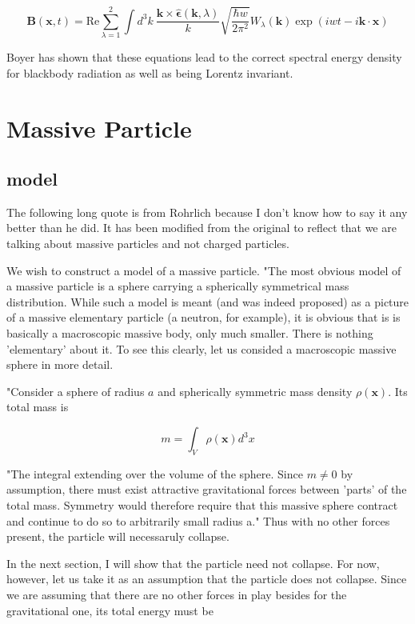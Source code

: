 \documentclass {article}
\renewcommand\vec{\mathbf}
\let\OldHat\hat
\renewcommand{\hat}[1]{\OldHat{\mathbf{#1}}}
\begin{document}
$$\vec B (\vec x ,  t) = \text {Re} \sum_{\lambda = 1}^2  \int d^3k ~ \frac {\vec k \times \hat \epsilon(\vec k, \lambda)} k \sqrt {\frac {\hbar w} {2 \pi^2}} W_{\lambda}(\vec k) \exp(iwt - i\vec k \cdot \vec x)$$


Boyer has shown that these equations lead to the correct spectral energy density for blackbody radiation as well as being Lorentz invariant.




\newpage

\section{Massive Particle}
\subsection{model}
The following long quote is from Rohrlich because I don't know how to say it any better than he did. It has been modified from the original to reflect that we are talking about massive particles and not charged particles.

We wish to construct a model of a massive particle. "The most obvious model of a massive particle is a sphere carrying a spherically symmetrical mass distribution. While such a model is meant (and was indeed proposed) as a picture of a massive elementary particle (a neutron, for example), it is obvious that is is basically a macroscopic massive body, only much smaller. There is nothing 'elementary' about it. To see this clearly, let us consided a macroscopic massive sphere in more detail.

"Consider a sphere of radius $a$ and spherically symmetric mass density $\rho (\vec x)$. Its total mass is

$$ m = \int_V \rho(\vec x) d^3x$$

"The integral extending over the volume of the sphere. Since $m \neq 0$ by assumption, there must exist attractive gravitational forces between 'parts' of the total mass. Symmetry would therefore require that this massive sphere contract and continue to do so to arbitrarily small radius a." Thus with no other forces present, the particle will necessaruly collapse.

In the next section, I will show that the particle need not collapse. For now, however, let us take it as an assumption that the particle does not collapse. Since we are assuming that there are no other forces in play besides for the gravitational one, its total energy must be
\end{document}
